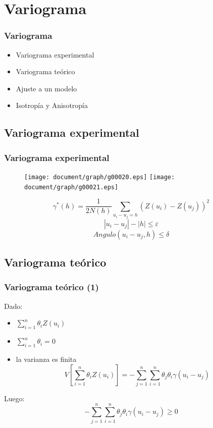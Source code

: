 \documentclass{beamer}
\begin{document}
\section{Variograma}
\begin{frame}
\frametitle{Variograma}
\begin{itemize}
\item Variograma experimental
\item Variograma teórico
\item Ajuste a un modelo
\item Isotropía y Anisotropía
\end{itemize}
\end{frame}


\subsection{Variograma experimental}
\begin{frame}
\frametitle{Variograma experimental}
\begin{figure}
\texttt{[image: document/graph/g00020.eps]}
\texttt{[image: document/graph/g00021.eps]}
\end{figure}
\begin{equation}
\gamma^*(h)=\frac{1}{2N(h)} \sum_{u_i-u_j=h} (Z(u_i) - Z(u_j))^2
\end{equation}
\begin{equation}
|u_i - u_j| - |h| \leq \varepsilon
\end{equation}
\begin{equation}
Angulo(u_i - u_j, h) \leq \delta
\end{equation}
\end{frame}


\subsection{Variograma teórico}
\begin{frame}
\frametitle{Variograma teórico (1)}
Dado:
\begin{itemize}
\item $\displaystyle\sum_{i=1}^n\theta_i Z(u_i)$
\item $\displaystyle\sum_{i=1}^n\theta_i = 0$
\item la varianza es finita
\begin{equation}
V\left[\sum_{i=1}^n\theta_i Z(u_i)\right] = - \sum_{j=1}^n \sum_{i=1}^n \theta_j \theta_i \gamma(u_i - u_j)
\end{equation}
\end{itemize}
Luego:
\begin{equation}
- \sum_{j=1}^n \sum_{i=1}^n \theta_j \theta_i \gamma(u_i - u_j) \geq 0
\label{eq:CondicionParaElVariograma}
\end{equation}
\end{frame}
\end{document}
